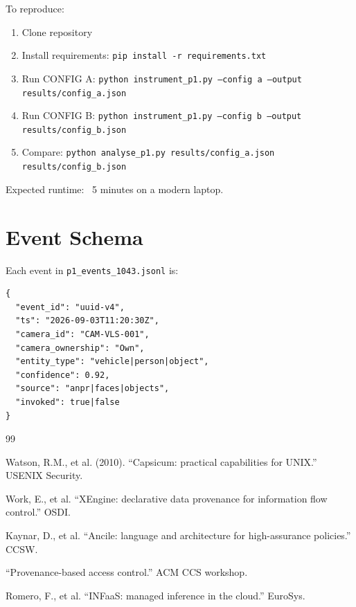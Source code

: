 \documentclass[sigplan,review]{acmart}
\begin{document}
To reproduce:
\begin{enumerate}
  \item Clone repository
  \item Install requirements: \texttt{pip install -r requirements.txt}
  \item Run CONFIG A: \texttt{python instrument\_p1.py --config a --output results/config\_a.json}
  \item Run CONFIG B: \texttt{python instrument\_p1.py --config b --output results/config\_b.json}
  \item Compare: \texttt{python analyse\_p1.py results/config\_a.json results/config\_b.json}
\end{enumerate}

Expected runtime: ~5 minutes on a modern laptop.

\section{Event Schema}

Each event in \texttt{p1\_events\_1043.jsonl} is:
\begin{lstlisting}
{
  "event_id": "uuid-v4",
  "ts": "2026-09-03T11:20:30Z",
  "camera_id": "CAM-VLS-001",
  "camera_ownership": "Own",
  "entity_type": "vehicle|person|object",
  "confidence": 0.92,
  "source": "anpr|faces|objects",
  "invoked": true|false
}
\end{lstlisting}

\begin{thebibliography}{99}

 Watson, R.M., et al. (2010). ``Capsicum: practical capabilities for UNIX.'' USENIX Security.

 Work, E., et al. ``XEngine: declarative data provenance for information flow control.'' OSDI.

 Kaynar, D., et al. ``Ancile: language and architecture for high-assurance policies.'' CCSW.

 ``Provenance-based access control.'' ACM CCS workshop.

 Romero, F., et al. ``INFaaS: managed inference in the cloud.'' EuroSys.

\end{thebibliography}
\end{document}
